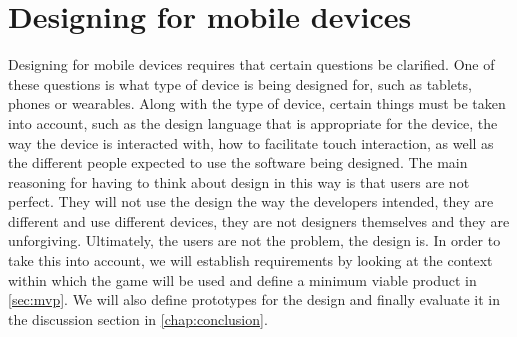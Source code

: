 \section{Designing for mobile devices}\label{sec:design-intro}
Designing for mobile devices requires that certain questions be clarified.
One of these questions is what type of device is being designed for, such as tablets, phones or wearables.
Along with the type of device, certain things must be taken into account, such as the design language that is appropriate for the device, the way the device is interacted with,  how to facilitate touch interaction, as well as the different people expected to use the software being designed.
The main reasoning for having to think about design in this way is that users are not perfect.
They will not use the design the way the developers intended, they are different and use different devices, they are not designers themselves and they are unforgiving.
Ultimately, the users are not the problem, the design is.
In order to take this into account, we will establish requirements by looking at the context within which the game will be used and define a minimum viable product in \autoref{sec:mvp}.
We will also define prototypes for the design and finally evaluate it in the discussion section in \autoref{chap:conclusion}.
